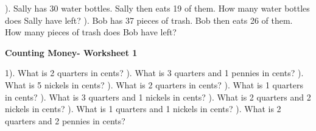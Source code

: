 \documentclass{article}%
\begin{document}
\newline%
\newline%
). Sally has 30 water bottles. Sally then eats 19 of them. How many water bottles does Sally have left?%
\newline%
\newline%
). Bob has 37 pieces of trash. Bob then eats 26 of them. How many pieces of trash does Bob have left?%
\newline%
\newline%
\newline%
\pagebreak%
\large%
\begin{center}%
\textbf{Counting Money- Worksheet 1}%
\newline%
\newline%
\newline%
\end{center} \normalsize%
1). What is 2 quarters in cents?%
\newline%
\newline%
). What is 3 quarters and 1 pennies in cents?%
\newline%
\newline%
). What is 5 nickels in cents?%
\newline%
\newline%
). What is 2 quarters in cents?%
\newline%
\newline%
). What is 1 quarters in cents?%
\newline%
\newline%
). What is 3 quarters and 1 nickels in cents?%
\newline%
\newline%
). What is 2 quarters and 2 nickels in cents?%
\newline%
\newline%
). What is 1 quarters and 1 nickels in cents?%
\newline%
\newline%
). What is 2 quarters and 2 pennies in cents?%
\newline%
\end{document}
